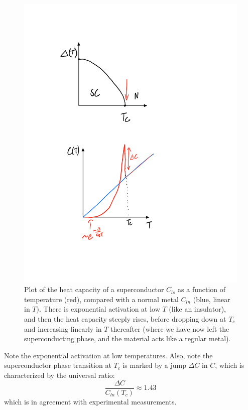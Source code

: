 \begin{figure}[htbp]
    \centering
    \includegraphics[scale=0.7]{Images/fig-scheatcapacity.pdf}
    \caption{Plot of the heat capacity of a superconductor $C_{ls}$ as a function of temperature (red), compared with a normal metal $C_{ln}$ (blue, linear in $T$). There is exponential activation at low $T$ (like an insulator), and then the heat capacity steeply rises, before dropping down at $T_c$ and increasing linearly in $T$ thereafter (where we have now left the superconducting phase, and the material acts like a regular metal).}
    \label{fig-scheatcapacity}
\end{figure}

Note the exponential activation at low temperatures. Also, note the superconductor phase transition at $T_c$ is marked by a jump $\Delta C$ in $C$, which is characterized by the universal ratio:
\begin{equation}
    \frac{\Delta C}{C_{ln}(T_c)} \approx 1.43
\end{equation}
which is in agreement with experimental measurements.

